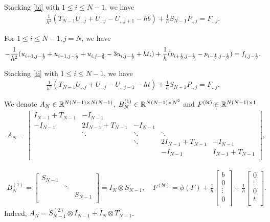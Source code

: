 \documentclass[english]{pkupaper}
\newenvironment{eqt}{\begin{equation}\begin{aligned}}{\end{aligned}\end{equation}}
\begin{document}
Stacking \ref{bi} with $1\leq i\leq N-1$, we have 
\begin{eqt}
\label{bi2}
\frac{1}{h^2}\left(T_{N-1}U_{,.j}+U_{,.j}-U_{,.j+1}-hb\right)+\frac{1}{h}S_{N-1}P_{.,j}=F_{.,j}.
\end{eqt}

For $1\leq i \leq N-1, j=N$, we have 
\begin{eqt}
\label{ti}
-\frac{1}{h^2}(u_{i+1,j-\oot}+u_{i-1,j-\oot}+u_{i,j-\frac{3}{2}}-3u_{i,j-\oot}+ht_i)+\frac{1}{h}(p_{i+\oot,j-\oot}-p_{i-\oot,j-\oot})=f_{i,j-\oot}.
\end{eqt}

Stacking \ref{ti} with $1\leq i\leq N-1$, we have 
\begin{eqt}
\label{ti2}
\frac{1}{h^2}\left(T_{N-1}U_{,.j}+U_{,.j}-U_{,.j-1}-ht\right)+\frac{1}{h}S_{N-1}P_{.,j}=F_{.,j}.
\end{eqt}

We denote $A_N\in \mathbb{R}^{N(N-1)\times N(N-1)}$, $B^{(1)}_N\in\mathbb{R}^{N(N-1)\times N^2}$ and $F^{(bt)}\in \mathbb{R}^{N(N-1)\times1}$
\begin{eqt}
\label{an}
A_N=\begin{bmatrix}
I_{N-1}+T_{N-1}&-I_{N-1}\\
-I_{N-1}&2I_{N-1}+T_{N-1}&-I_{N-1}\\
&\ddots&\ddots&\ddots\\
&&\ddots&2I_{N-1}+T_{N-1}&-I_{N-1}\\
&&&-I_{N-1}&I_{N-1}+T_{N-1}\\
\end{bmatrix},
\end{eqt}

\begin{eqt}\label{bn1}
B_N^{(1)}=\begin{bmatrix}
S_{N-1}\\
&\ddots\\
&&S_{N-1}\\
\end{bmatrix}=I_N\otimes S_{N-1}, \quad F^{(bt)}=\phi(F)+\frac{1}{h}\begin{bmatrix}
b\\
0\\
\vdots\\
0\\
\end{bmatrix}+\frac{1}{h}\begin{bmatrix}
0\\
\vdots\\
0\\
t\\
\end{bmatrix}.
\end{eqt}
Indeed, $A_N=S_{N-1}^{(2)}\otimes I_{N-1}+I_{N}\otimes T_{N-1}$.
\end{document}
